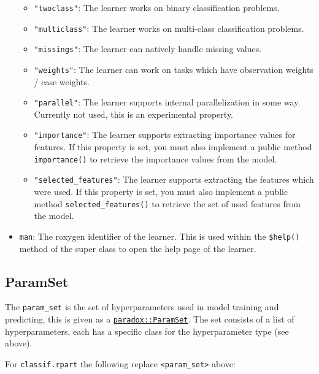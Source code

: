 \documentclass[
]{scrbook}
\providecommand{\tightlist}{%
  \setlength{\itemsep}{0pt}\setlength{\parskip}{0pt}}
\begin{document}
\begin{itemize}
  \begin{itemize}
  \tightlist
  \item
    \texttt{"twoclass"}: The learner works on binary classification problems.
  \item
    \texttt{"multiclass"}: The learner works on multi-class classification problems.
  \item
    \texttt{"missings"}: The learner can natively handle missing values.
  \item
    \texttt{"weights"}: The learner can work on tasks which have observation weights / case weights.
  \item
    \texttt{"parallel"}: The learner supports internal parallelization in some way.
    Currently not used, this is an experimental property.
  \item
    \texttt{"importance"}: The learner supports extracting importance values for features.
    If this property is set, you must also implement a public method \texttt{importance()} to retrieve the importance values from the model.
  \item
    \texttt{"selected\_features"}: The learner supports extracting the features which were used.
    If this property is set, you must also implement a public method \texttt{selected\_features()} to retrieve the set of used features from the model.
  \end{itemize}
\item
  \texttt{man}: The roxygen identifier of the learner.
  This is used within the \texttt{\$help()} method of the super class to open the help page of the learner.
\end{itemize}

\hypertarget{param-set}{%
\subsection{ParamSet}\label{param-set}}

The \texttt{param\_set} is the set of hyperparameters used in model training and predicting, this is given as a \href{https://paradox.mlr-org.com/reference/ParamSet.html}{\texttt{paradox::ParamSet}}. The set consists of a list of hyperparameters, each has a specific class for the hyperparameter type (see above).

For \texttt{classif.rpart} the following replace \texttt{\textless{}param\_set\textgreater{}} above:
\end{document}
